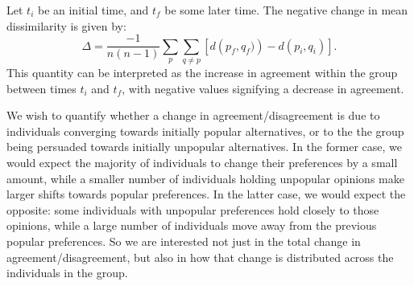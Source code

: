 Let $t_i$ be an initial time, and $t_f$ be some later time.
The negative change in mean dissimilarity is given by:
\begin{equation}
    \label{eqn:Delta}
    \Delta =
    \frac{-1}{n(n-1)} \sum_p \sum_{q \neq p}
    \left[
    d\left(p_f, q_f)\right)
    - d\left(p_i, q_i\right)
    \right].
\end{equation}
This quantity can be interpreted as the increase in agreement within the group between times $t_i$ and $t_f$,
with negative values signifying a decrease in agreement.

We wish to quantify whether a change in agreement/disagreement is due to individuals converging towards initially popular alternatives, or to the the group being persuaded towards initially unpopular alternatives.
In the former case, we would expect the majority of individuals to change their preferences by a small amount, while a smaller number of individuals holding unpopular opinions make larger shifts towards popular preferences.
In the latter case, we would expect the opposite:
some individuals with unpopular preferences hold closely to those opinions, while a large number of individuals move away from the previous popular preferences.
So we are interested not just in the total change in agreement/disagreement,
but also in how that change is distributed across the individuals in the group.

